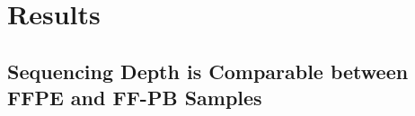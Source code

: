 
\chapter{Results}
\label{ch:Results}

\section{Sequencing Depth is Comparable between FFPE and FF-PB Samples}
\label{sec:SequencingDepthisComparablebetweenFFPEandFF-PBSamples}
